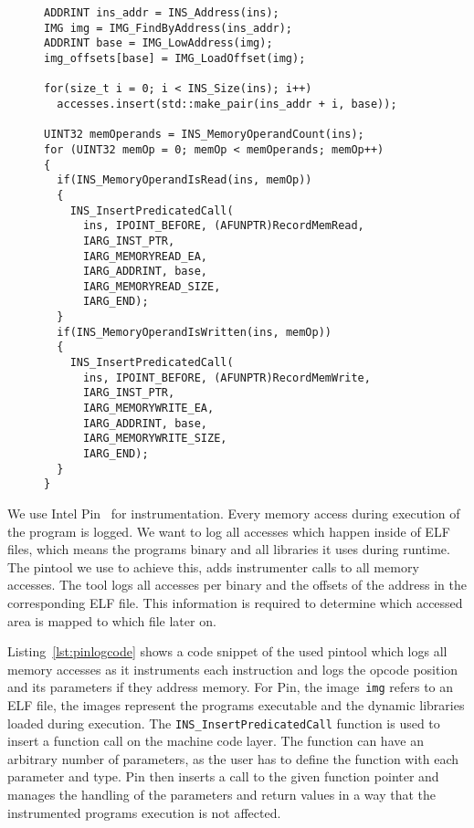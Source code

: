 \begin{figure}
\begin{minipage}{\linewidth}
\begin{lstlisting}[style=CStyle,
                   caption={Example C++ code for a pintool logging memory
accesses. The tool stores the locations of instructions and parameters if they
point to memory. The tool stores accesses for reading and writing seperately.},
                   label={lst:pinlogcode}]
ADDRINT ins_addr = INS_Address(ins);
IMG img = IMG_FindByAddress(ins_addr);
ADDRINT base = IMG_LowAddress(img);
img_offsets[base] = IMG_LoadOffset(img);

for(size_t i = 0; i < INS_Size(ins); i++)
  accesses.insert(std::make_pair(ins_addr + i, base));

UINT32 memOperands = INS_MemoryOperandCount(ins);
for (UINT32 memOp = 0; memOp < memOperands; memOp++)
{
  if(INS_MemoryOperandIsRead(ins, memOp))
  {
    INS_InsertPredicatedCall(
      ins, IPOINT_BEFORE, (AFUNPTR)RecordMemRead,
      IARG_INST_PTR,
      IARG_MEMORYREAD_EA,
      IARG_ADDRINT, base,
      IARG_MEMORYREAD_SIZE,
      IARG_END);
  }
  if(INS_MemoryOperandIsWritten(ins, memOp))
  {
    INS_InsertPredicatedCall(
      ins, IPOINT_BEFORE, (AFUNPTR)RecordMemWrite,
      IARG_INST_PTR,
      IARG_MEMORYWRITE_EA,
      IARG_ADDRINT, base,
      IARG_MEMORYWRITE_SIZE,
      IARG_END);
  }
}
\end{lstlisting}
\end{minipage}
\end{figure}

We use Intel Pin~\cite{pintool} for instrumentation. Every memory access
during execution of the program is logged. We want to log all accesses which
happen inside of ELF files, which means the program\textquotesingle s binary
and all libraries it uses during runtime. The pintool we use to achieve this,
adds instrumenter calls to all memory accesses. The tool logs all accesses
per binary and the offsets of the address in the corresponding ELF file. This
information is required to determine which accessed area is mapped to which
file later on.

Listing~\ref{lst:pinlogcode} shows a code snippet of the used pintool which
logs all memory accesses as it instruments each instruction and logs the opcode
position and its parameters if they address memory. For Pin, the
image~\texttt{img} refers to an ELF file, the images represent the
program\textquotesingle s executable and the dynamic libraries loaded during
execution. The \texttt{INS\_InsertPredicatedCall} function is used to insert a
function call on the machine code layer. The function can have an arbitrary
number of parameters, as the user has to define the function with each
parameter and type. Pin then inserts a call to the given function pointer and
manages the handling of the parameters and return values in a way that the
instrumented program\textquotesingle s execution is not affected.


